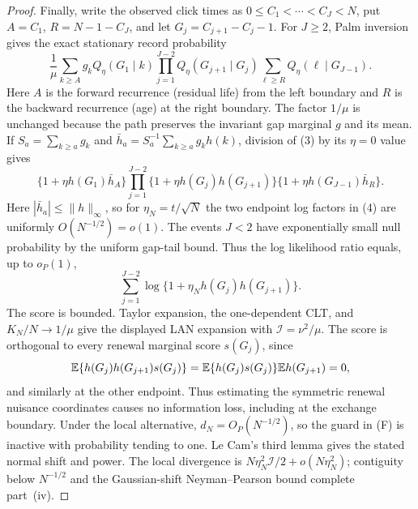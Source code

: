 \begin{proof}
Finally, write the observed click times as
$0\le C_1<\cdots<C_J<N$, put $A=C_1$, $R=N-1-C_J$, and let
$G_j=C_{j+1}-C_j-1$.  For $J\ge2$, Palm inversion gives the exact stationary
record probability
\[
\frac1\mu\sum_{k\ge A}g_kQ_\eta(G_1\mid k)
\prod_{j=1}^{J-2}Q_\eta(G_{j+1}\mid G_j)
\sum_{\ell\ge R}Q_\eta(\ell\mid G_{J-1}).
\tag{3}
\]
Here $A$ is the forward recurrence (residual life) from the left boundary and
$R$ is the backward recurrence (age) at the right boundary.
The factor $1/\mu$ is unchanged because the path preserves the invariant gap
marginal $g$ and its mean.  If $S_a=\sum_{k\ge a}g_k$ and
$\bar h_a=S_a^{-1}\sum_{k\ge a}g_kh(k)$, division of \textup{(3)} by its
$\eta=0$ value gives
\[
\{1+\eta h(G_1)\bar h_A\}
\prod_{j=1}^{J-2}\{1+\eta h(G_j)h(G_{j+1})\}
\{1+\eta h(G_{J-1})\bar h_R\}.
\tag{4}
\]
Here $|\bar h_a|\le\|h\|_\infty$, so for $\eta_N=t/\sqrt N$ the two endpoint
log factors in \textup{(4)} are uniformly $O(N^{-1/2})=o(1)$.  The events
$J<2$ have exponentially small null probability by the uniform gap-tail
bound.  Thus the log likelihood ratio equals, up to $o_P(1)$,
\[
\sum_{j=1}^{J-2}\log\{1+\eta_Nh(G_j)h(G_{j+1})\}.
\]
The score is bounded.  Taylor expansion, the one-dependent CLT, and
$K_N/N\to1/\mu$ give the displayed LAN expansion with
$\mathcal I=\nu^2/\mu$.  The score is orthogonal to every renewal marginal
score $s(G_j)$, since
\[
\mathbb{E}\{h(G_j)h(G_{j+1})s(G_j)\}
=\mathbb{E}\{h(G_j)s(G_j)\}\mathbb{E} h(G_{j+1})=0,
\]
and similarly at the other endpoint.  Thus estimating the symmetric renewal
nuisance coordinates causes no information loss, including at the exchange
boundary.  Under the local alternative, $d_N=O_P(N^{-1/2})$, so the guard in
\textup{(F)} is inactive with probability tending to one.  Le Cam's third
lemma gives the stated normal shift and power.  The local divergence is
$N\eta_N^2\mathcal I/2+o(N\eta_N^2)$; contiguity below $N^{-1/2}$ and the
Gaussian-shift Neyman--Pearson bound complete part~\textup{(iv)}.
\end{proof}

